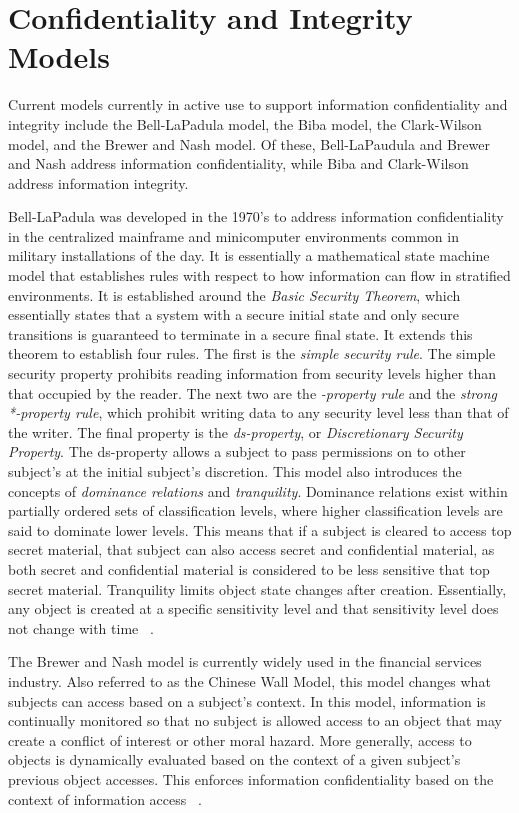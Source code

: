 \section{Confidentiality and Integrity Models}
Current models currently in active use to support information confidentiality and integrity include the Bell-LaPadula model, the Biba model,  the Clark-Wilson model, and the Brewer and Nash model.  Of these, Bell-LaPaudula and Brewer and Nash address information confidentiality, while Biba and Clark-Wilson address information integrity.

Bell-LaPadula was developed in the 1970's to address information confidentiality in the centralized mainframe and minicomputer environments  common in military installations of the day.  It is essentially a mathematical state machine model that establishes rules with respect to how information can flow in stratified environments.  It is established around the {\it Basic Security Theorem}, which essentially states that a system with a secure initial state and only secure transitions is guaranteed to terminate in a secure final state.  It extends this theorem to establish four rules.  The first is the {\it simple security rule}.  The simple security property prohibits reading information from security levels higher than that occupied by the reader.  The next two are the {\it *-property rule} and the {\it strong *-property rule}, which prohibit writing data to any security level less than that of the writer.  The final property is the {\it ds-property}, or {\it Discretionary Security Property}.  The ds-property allows a subject to pass permissions on to other subject's at the initial subject's discretion.  This model also introduces the concepts of {\it dominance relations} and {\it tranquility}.  Dominance relations exist within partially ordered sets of classification levels, where higher classification levels are said to dominate lower levels.  This means that if a subject is cleared to access top secret material, that subject can also access secret and confidential material, as both secret and confidential material is considered to be less sensitive that top secret material.  Tranquility limits object state changes after creation.  Essentially, any object is created at a specific sensitivity level and that sensitivity level does not change with time ~\cite{Bell1973}.

The Brewer and Nash model is currently widely used in the financial services industry.  Also referred to as the Chinese Wall Model, this model changes what subjects can access based on a subject's context.  In this model, information is continually monitored so that no subject is allowed access to an object that may create a conflict of interest or other moral hazard.  More generally, access to objects is dynamically evaluated based on the context of a given subject's previous object accesses. This enforces information confidentiality based on the context of information access ~\cite{Brewer89}.

